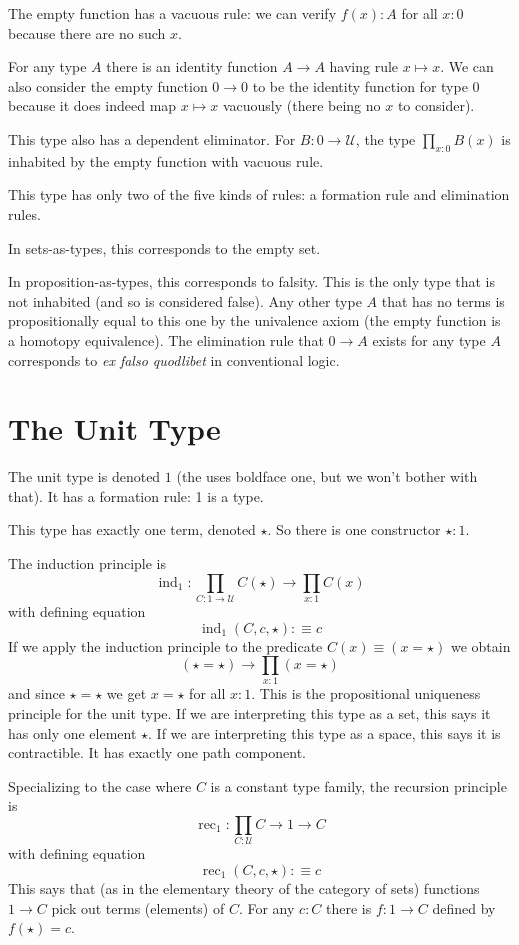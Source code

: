 \documentclass[11pt]{article}
\newcommand{\universe}{\mathcal{U}}
\DeclareMathOperator{\inductor}{ind}
\DeclareMathOperator{\recursor}{rec}
\begin{document}
The empty function has a vacuous rule: we can verify $f(x) : A$ for all $x : 0$
because there are no such $x$.

For any type $A$ there is an identity function $A \to A$ having
rule $x \mapsto x$.  We can also consider the empty function $0 \to 0$
to be the identity function for type $0$ because it does indeed map
$x \mapsto x$ vacuously (there being no $x$ to consider).

This type also has a dependent eliminator.  For $B : 0 \to \universe$,
the type $\prod_{x : 0} B(x)$ is inhabited by the empty function with vacuous
rule.

This type has only two of the five kinds of rules: a formation rule
and elimination rules.

In sets-as-types, this corresponds to the empty set.

In proposition-as-types, this corresponds to falsity.
This is the only type that is not inhabited (and so is considered false).
Any other type $A$ that has no terms is propositionally equal to
this one by the univalence
axiom (the empty function is a homotopy equivalence).
The elimination rule that $0 \to A$ exists for any type $A$ corresponds
to \emph{ex falso quodlibet} in conventional logic.

\section{The Unit Type}

The unit type is denoted $1$ (the  uses boldface
one, but we won't bother with that).  It has a formation rule: 1 is a type.

This type has exactly one term, denoted $\star$.  So there is one constructor
$\star : 1$.

The induction principle is
$$
   \inductor_1 : \prod_{C : 1 \to \universe} C(\star) \to \prod_{x : 1} C(x)
$$
with defining equation
$$
   \inductor_1(C, c, \star) :\equiv c
$$
If we apply the induction principle to the predicate
$C(x) \equiv (x = \star)$ we obtain
$$
   (\star = \star) \to \prod_{x : 1} (x = \star)
$$
and since $\star = \star$ we get $x = \star$ for all $x : 1$.
This is the propositional uniqueness principle for the unit type.
If we are interpreting this type as a set, this says it has only one
element $\star$.
If we are interpreting this type as a space, this says it is contractible.
It has exactly one path component.

Specializing to the case where $C$ is a constant type family, the
recursion principle is
$$
   \recursor_1 : \prod_{C : \universe} C \to 1 \to C
$$
with defining equation
$$
   \recursor_1(C, c, \star) :\equiv c
$$
This says that (as in the elementary theory of the category of sets)
functions $1 \to C$ pick out terms (elements) of $C$.
For any $c : C$ there is $f : 1 \to C$ defined by $f(\star) = c$.
\end{document}
